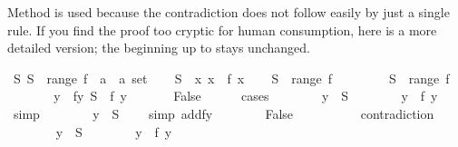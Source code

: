\begin{isabellebody}
\begin{isamarkuptext}
Method  is used because the contradiction does not follow easily
by just a single rule. If you find the proof too cryptic for human
consumption, here is a more detailed version; the beginning up to
 stays unchanged.%
\end{isamarkuptext}%
\isamarkupfalse%
\ {\isachardoublequote}{\isasymexists}S{\isachardot}\ S\ {\isasymnotin}\ range\ {\isacharparenleft}f\ {\isacharcolon}{\isacharcolon}\ {\isacharprime}a\ {\isasymRightarrow}\ {\isacharprime}a\ set{\isacharparenright}{\isachardoublequote}\isanewline
%
\isadelimproof
%
\endisadelimproof
%
\isatagproof
\isamarkupfalse%
\isanewline
\ \ \isamarkupfalse%
\ {\isacharquery}S\ {\isacharequal}\ {\isachardoublequote}{\isacharbraceleft}x{\isachardot}\ x\ {\isasymnotin}\ f\ x{\isacharbraceright}{\isachardoublequote}\isanewline
\ \ \isamarkupfalse%
\ {\isachardoublequote}{\isacharquery}S\ {\isasymnotin}\ range\ f{\isachardoublequote}\isanewline
\ \ \isamarkupfalse%
\isanewline
\ \ \ \ \isamarkupfalse%
\ {\isachardoublequote}{\isacharquery}S\ {\isasymin}\ range\ f{\isachardoublequote}\isanewline
\ \ \ \ \isamarkupfalse%
\ \isamarkupfalse%
\ y\ \ fy{\isacharcolon}\ {\isachardoublequote}{\isacharquery}S\ {\isacharequal}\ f\ y{\isachardoublequote}\ \isamarkupfalse%
\isacommand{{\isachardot}{\isachardot}}\isanewline
\ \ \ \ \isamarkupfalse%
\ False\isanewline
\ \ \ \ \isamarkupfalse%
\ cases\isanewline
\ \ \ \ \ \ \isamarkupfalse%
\ {\isachardoublequote}y\ {\isasymin}\ {\isacharquery}S{\isachardoublequote}\isanewline
\ \ \ \ \ \ \isamarkupfalse%
\ {\isachardoublequote}y\ {\isasymnotin}\ f\ y{\isachardoublequote}\ \ \ \isamarkupfalse%
\ simp\isanewline
\ \ \ \ \ \ \isamarkupfalse%
\ {\isachardoublequote}y\ {\isasymnotin}\ {\isacharquery}S{\isachardoublequote}\ \ \ \ \isamarkupfalse%
simp\ add{\isacharcolon}fy{\isacharparenright}\isanewline
\ \ \ \ \ \ \isamarkupfalse%
\ False\ \ \ \ \ \ \ \ \ \isamarkupfalse%
\ contradiction\isanewline
\ \ \ \ \isamarkupfalse%
\isanewline
\ \ \ \ \ \ \isamarkupfalse%
\ {\isachardoublequote}y\ {\isasymnotin}\ {\isacharquery}S{\isachardoublequote}\isanewline
\ \ \ \ \ \ \isamarkupfalse%
\ {\isachardoublequote}y\ {\isasymin}\ f\ y{\isachardoublequote}\ \ \ \isamarkupfalse%

\end{isabellebody}

